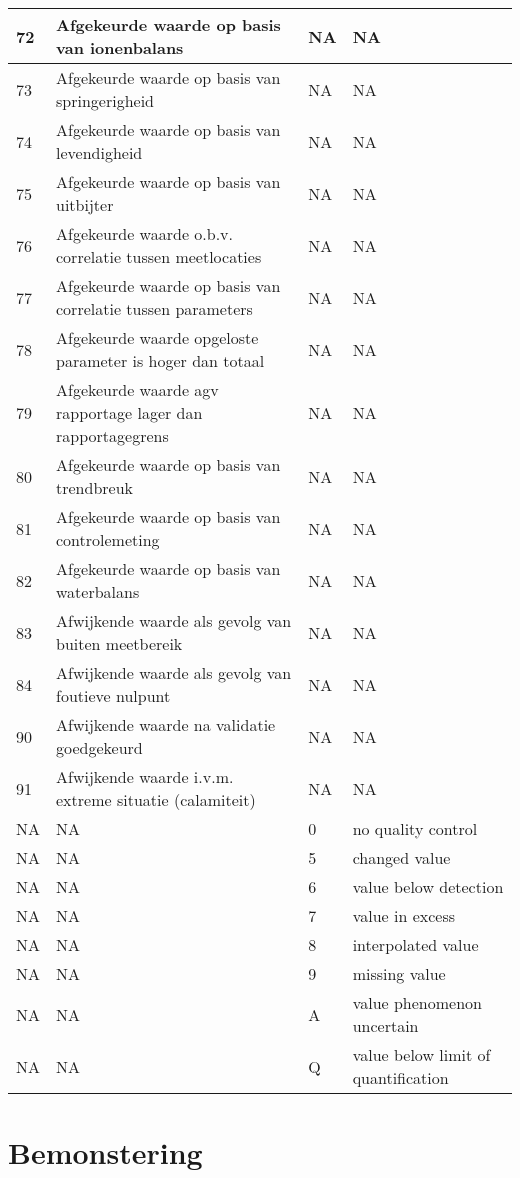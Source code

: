 \documentclass[
]{book}
\begin{document}
\begin{table}
\begin{tabular}[t]{l|l|l|l}
\hline
72 & Afgekeurde waarde op basis van ionenbalans & NA & NA\\
\hline
73 & Afgekeurde waarde op basis van springerigheid & NA & NA\\
\hline
74 & Afgekeurde waarde op basis van levendigheid & NA & NA\\
\hline
75 & Afgekeurde waarde op basis van uitbijter & NA & NA\\
\hline
76 & Afgekeurde waarde o.b.v. correlatie tussen meetlocaties & NA & NA\\
\hline
77 & Afgekeurde waarde op basis van correlatie tussen parameters & NA & NA\\
\hline
78 & Afgekeurde waarde opgeloste parameter is hoger dan totaal & NA & NA\\
\hline
79 & Afgekeurde waarde agv rapportage lager dan rapportagegrens & NA & NA\\
\hline
80 & Afgekeurde waarde op basis van trendbreuk & NA & NA\\
\hline
81 & Afgekeurde waarde op basis van controlemeting & NA & NA\\
\hline
82 & Afgekeurde waarde op basis van waterbalans & NA & NA\\
\hline
83 & Afwijkende waarde als gevolg van buiten meetbereik & NA & NA\\
\hline
84 & Afwijkende waarde als gevolg van foutieve nulpunt & NA & NA\\
\hline
90 & Afwijkende waarde na validatie goedgekeurd & NA & NA\\
\hline
91 & Afwijkende waarde i.v.m. extreme situatie (calamiteit) & NA & NA\\
\hline
NA & NA & 0 & no quality control\\
\hline
NA & NA & 5 & changed value\\
\hline
NA & NA & 6 & value below detection\\
\hline
NA & NA & 7 & value in excess\\
\hline
NA & NA & 8 & interpolated value\\
\hline
NA & NA & 9 & missing value\\
\hline
NA & NA & A & value phenomenon uncertain\\
\hline
NA & NA & Q & value below limit of quantification\\
\hline
\end{tabular}
\end{table}

\hypertarget{bemonstering}{%
\chapter{Bemonstering}\label{bemonstering}}
\end{document}
